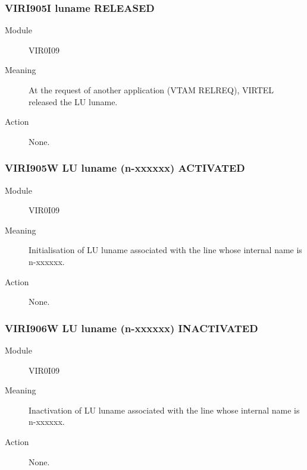 \documentclass[letterpaper,10pt,english]{sphinxmanual}
\begin{document}
\subsubsection{VIRI905I luname RELEASED}
\label{\detokenize{messages:viri905i-luname-released}}\begin{description}
\item[{Module}] \leavevmode
VIR0I09

\item[{Meaning}] \leavevmode
At the request of another application (VTAM RELREQ), VIRTEL released the LU luname.

\item[{Action}] \leavevmode
None.

\end{description}


\subsubsection{VIRI905W LU luname (n-xxxxxx) ACTIVATED}
\label{\detokenize{messages:viri905w-lu-luname-n-xxxxxx-activated}}\begin{description}
\item[{Module}] \leavevmode
VIR0I09

\item[{Meaning}] \leavevmode
Initialisation of LU luname associated with the line whose internal name is n-xxxxxx.

\item[{Action}] \leavevmode
None.

\end{description}


\subsubsection{VIRI906W LU luname (n-xxxxxx) INACTIVATED}
\label{\detokenize{messages:viri906w-lu-luname-n-xxxxxx-inactivated}}\begin{description}
\item[{Module}] \leavevmode
VIR0I09

\item[{Meaning}] \leavevmode
Inactivation of LU luname associated with the line whose internal name is n-xxxxxx.

\item[{Action}] \leavevmode
None.

\end{description}
\end{document}

